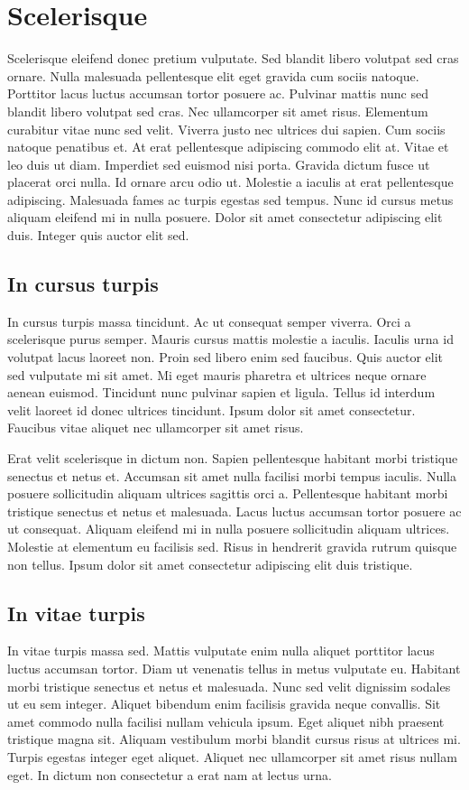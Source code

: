 \chapter{Scelerisque}
Scelerisque eleifend donec pretium vulputate. Sed blandit libero volutpat sed cras ornare. Nulla malesuada pellentesque elit eget gravida cum sociis natoque. Porttitor lacus luctus accumsan tortor posuere ac. Pulvinar mattis nunc sed blandit libero volutpat sed cras. Nec ullamcorper sit amet risus. Elementum curabitur vitae nunc sed velit. Viverra justo nec ultrices dui sapien. Cum sociis natoque penatibus et. At erat pellentesque adipiscing commodo elit at. Vitae et leo duis ut diam. Imperdiet sed euismod nisi porta. Gravida dictum fusce ut placerat orci nulla. Id ornare arcu odio ut. Molestie a iaculis at erat pellentesque adipiscing. Malesuada fames ac turpis egestas sed tempus. Nunc id cursus metus aliquam eleifend mi in nulla posuere. Dolor sit amet consectetur adipiscing elit duis. Integer quis auctor elit sed.

\section{In cursus turpis}
In cursus turpis massa tincidunt. Ac ut consequat semper viverra. Orci a scelerisque purus semper. Mauris cursus mattis molestie a iaculis. Iaculis urna id volutpat lacus laoreet non. Proin sed libero enim sed faucibus. Quis auctor elit sed vulputate mi sit amet. Mi eget mauris pharetra et ultrices neque ornare aenean euismod. Tincidunt nunc pulvinar sapien et ligula. Tellus id interdum velit laoreet id donec ultrices tincidunt. Ipsum dolor sit amet consectetur. Faucibus vitae aliquet nec ullamcorper sit amet risus.

Erat velit scelerisque in dictum non. Sapien pellentesque habitant morbi tristique senectus et netus et. Accumsan sit amet nulla facilisi morbi tempus iaculis. Nulla posuere sollicitudin aliquam ultrices sagittis orci a. Pellentesque habitant morbi tristique senectus et netus et malesuada. Lacus luctus accumsan tortor posuere ac ut consequat. Aliquam eleifend mi in nulla posuere sollicitudin aliquam ultrices. Molestie at elementum eu facilisis sed. Risus in hendrerit gravida rutrum quisque non tellus. Ipsum dolor sit amet consectetur adipiscing elit duis tristique.

\section{In vitae turpis}
In vitae turpis massa sed. Mattis vulputate enim nulla aliquet porttitor lacus luctus accumsan tortor. Diam ut venenatis tellus in metus vulputate eu. Habitant morbi tristique senectus et netus et malesuada. Nunc sed velit dignissim sodales ut eu sem integer. Aliquet bibendum enim facilisis gravida neque convallis. Sit amet commodo nulla facilisi nullam vehicula ipsum. Eget aliquet nibh praesent tristique magna sit. Aliquam vestibulum morbi blandit cursus risus at ultrices mi. Turpis egestas integer eget aliquet. Aliquet nec ullamcorper sit amet risus nullam eget. In dictum non consectetur a erat nam at lectus urna.


